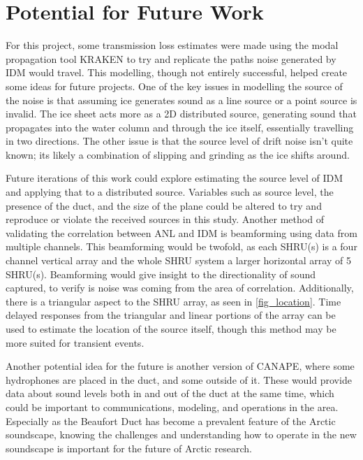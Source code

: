 \section{Potential for Future Work}


For this project, some transmission loss estimates were made using the modal propagation tool KRAKEN to try and replicate the paths noise generated by IDM would travel. This modelling, though not entirely successful, helped create some ideas for future projects. One of the key issues in modelling the source of the noise is that assuming ice generates sound as a line source or a point source is invalid. The ice sheet acts more as a 2D distributed source, generating sound that propagates into the water column and through the ice itself, essentially travelling in two directions. The other issue is that the source level of drift noise isn't quite known; its likely a combination of slipping and grinding as the ice shifts around.

Future iterations of this work could explore estimating the source level of IDM and applying that to a distributed source. Variables such as source level, the presence of the duct, and the size of the plane could be altered to try and reproduce or violate the received sources in this study. Another method of validating the correlation between ANL and IDM is beamforming using data from multiple channels. This beamforming would be twofold, as each SHRU(s) is a four channel vertical array and the whole SHRU system a larger horizontal array of 5 SHRU(s). Beamforming would give insight to the directionality of sound captured, to verify is noise was coming from the area of correlation. Additionally, there is a triangular aspect to the SHRU array, as seen in \autoref{fig_location}. Time delayed responses from the triangular and linear portions of the array can be used to estimate the location of the source itself, though this method may be more suited for transient events.

Another potential idea for the future is another version of CANAPE, where some hydrophones are placed in the duct, and some outside of it. These would provide data about sound levels both in and out of the duct at the same time, which could be important to communications, modeling, and operations in the area. Especially as the Beaufort Duct has become a prevalent feature of the Arctic soundscape, knowing the challenges and understanding how to operate in the new soundscape is important for the future of Arctic research.


